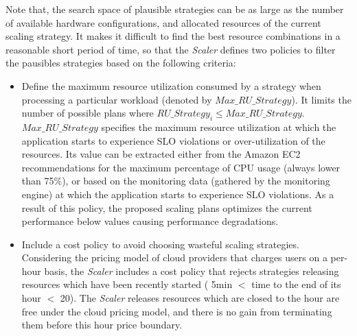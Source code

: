 
Note that, the search space of plausible strategies can be as large as the number of available hardware configurations, and allocated resources of the current scaling strategy. It makes it difficult to find the best resource combinations in a reasonable short period of time, so that the \emph{Scaler} defines two policies to filter the pausibles strategies based on the following criteria:


\begin{itemize}

\item Define the maximum resource utilization consumed  by a strategy when processing a particular workload (denoted by \emph{$Max\_RU\_Strategy$}). It limits the number of possible plans where \emph{$RU\_Strategy_{i} \leq Max\_RU\_Strategy$}. \emph{$Max\_RU\_Strategy$} specifies the maximum resource utilization at which the application starts to experience SLO violations or over-utilization of the resources. Its value can be extracted either from the Amazon EC2 recommendations for the maximum percentage of CPU usage (always lower than 75\%), or based on the monitoring data (gathered by the monitoring engine) at which the application starts to experience SLO violations. As a result of this policy, the proposed scaling plans optimizes the current performance below values causing performance degradations. 


\item Include a cost policy to avoid choosing wasteful scaling strategies. Considering the pricing model of cloud providers that charges users on a per-hour basis, the \emph{Scaler} includes a cost policy that rejects strategies releasing resources which have been recently started ( 5min $<$ time to the end of its hour $<$ 20). The \emph{Scaler} releases resources which are closed to the hour are free under the cloud pricing model, and there is no gain from terminating them before this hour price boundary.

\end{itemize}

